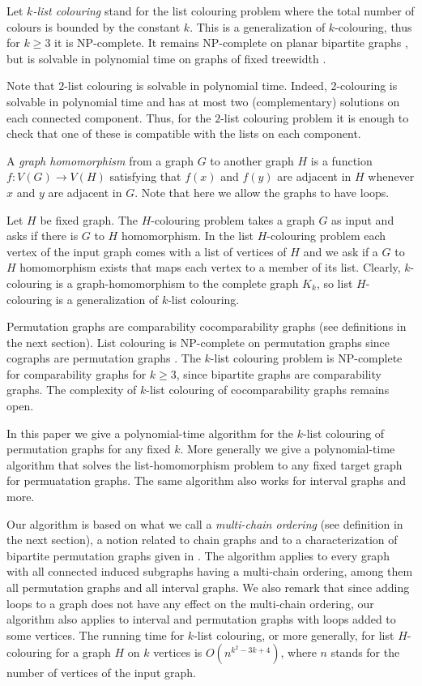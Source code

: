 \documentclass[12pt]{llncs}
\begin{document}
Let {\em $k$-list colouring} stand for the list colouring problem where the total number of colours is bounded by the constant $k$. This is a generalization of $k$-colouring, thus for $k\ge3$ it is NP-complete.  It remains NP-complete on planar bipartite graphs \cite{kratochvilFixedColourBound}, but is solvable in polynomial time on graphs of fixed treewidth \cite{bigPaper}.    

Note that $2$-list colouring is solvable in polynomial time. Indeed,
2-colouring is solvable in polynomial time and has at most two
(complementary) solutions on each connected component. Thus, for the
$2$-list colouring problem it is enough to check that one of these is
compatible with the lists on each component.

A {\em graph homomorphism} from a graph $G$ to another graph $H$ is a
function $f:V(G)\to V(H)$ satisfying that $f(x)$ and $f(y)$ are adjacent in
$H$ whenever $x$ and $y$ are adjacent in $G$. Note that here we allow the
graphs to have loops.

Let $H$ be fixed graph. The $H$-colouring problem takes a graph $G$ as
input and asks if there is $G$ to $H$ homomorphism. In the list $H$-colouring
problem each vertex of the input graph comes with a list of vertices of $H$
and we ask if a $G$ to $H$ homomorphism exists that maps each vertex to a
member of its list. Clearly, $k$-colouring is a
graph-homomorphism to the complete graph $K_k$, so list $H$-colouring is a
generalization of $k$-list colouring.

Permutation graphs are comparability cocomparability graphs (see definitions
in the next section). List colouring is NP-complete
on permutation graphs since cographs are
permutation graphs \cite{jansenScheffler}. The $k$-list colouring problem is
NP-complete for comparability graphs for $k\ge3$, since bipartite graphs are
comparability graphs. The complexity of $k$-list colouring of cocomparability
graphs remains open.

In this paper we give a polynomial-time algorithm for the $k$-list colouring
of permutation graphs for any fixed $k$. More generally we give a
polynomial-time algorithm that solves the list-homomorphism problem to any
fixed target graph for permuatation graphs. The same algorithm also works for
interval graphs and more.

Our algorithm is based on what we call a {\em multi-chain
ordering} (see definition in the next section), a notion related to 
chain graphs \cite{Yann} and to a characterization of 
bipartite permutation graphs given in \cite{BL}.
The algorithm applies to every graph with all connected induced subgraphs
having a multi-chain ordering, among them all permutation graphs and
all interval graphs. We also remark that since adding loops to a graph does not have
any effect on the multi-chain ordering, our algorithm also applies to interval
and permutation graphs with loops added to some vertices.
The running time for $k$-list colouring, or more
generally, for list $H$-colouring for a graph $H$ on $k$ vertices is
$O(n^{k^2-3k+4})$, where $n$ stands for the number of vertices of the input
graph.
\end{document}
